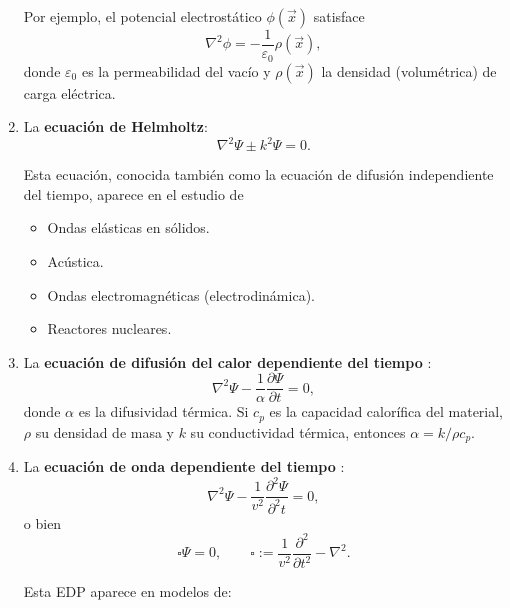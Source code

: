 \begin{enumerate}
    Por ejemplo, el potencial electrostático $\phi(\Vec{x})$ satisface
    \begin{equation}
      \nabla^2 \phi = - \frac{1}{\varepsilon_0} \rho(\Vec{x}),  
    \end{equation}
    donde $\varepsilon_0$ es la permeabilidad del vacío y $\rho(\Vec{x})$ la densidad (volumétrica) de carga eléctrica.
    
    \item La \textbf{ecuación de Helmholtz}:
         \begin{equation}
            \nabla^2 \Psi \pm k^2 \Psi = 0. \label{EcHelmholtz}
    \end{equation}

    Esta ecuación, conocida también como la ecuación de difusión independiente del tiempo, aparece en el estudio de 
    
    \begin{itemize}
        \item Ondas elásticas en sólidos.
        \item Acústica.
        \item Ondas electromagnéticas (electrodinámica).
        \item Reactores nucleares.
    \end{itemize}
    
    \item La \textbf{ecuación de difusión del calor dependiente del tiempo} :
     \begin{equation}
            \nabla^2 \Psi - \frac{1}{\alpha} \frac{\partial \Psi}{\partial t} = 0, \label{EcCalor}
    \end{equation}
    donde $\alpha$ es la difusividad térmica. Si $c_p$ es la capacidad calorífica del material, $\rho$ su densidad de masa y $k$ su conductividad térmica, entonces $\alpha = k/\rho c_p$.
    
     \item La \textbf{ecuación de onda  dependiente del tiempo} :
     \begin{equation}
            \nabla^2 \Psi - \frac{1}{v^2} \frac{\partial^2 \Psi}{\partial^2 t} = 0, \label{EcOnda1}
    \end{equation}
    o bien 
     \begin{equation}
        \square \Psi = 0, \qquad \square := \frac{1}{v^2} \frac{\partial^2}{\partial t^2} - \nabla^2.     \label{EcOnda2}
    \end{equation}
    
    Esta EDP aparece en modelos de:
    

\end{enumerate}

